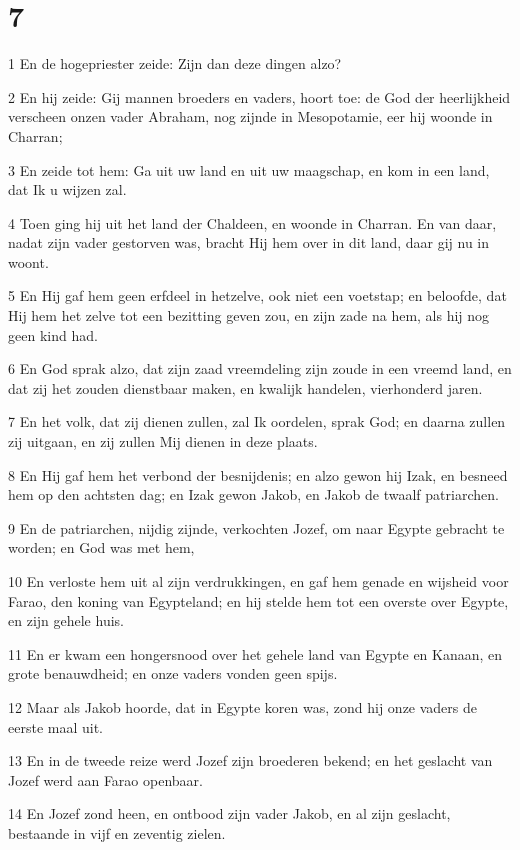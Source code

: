 \chapter{7}

\par 1 En de hogepriester zeide: Zijn dan deze dingen alzo?
\par 2 En hij zeide: Gij mannen broeders en vaders, hoort toe: de God der heerlijkheid verscheen onzen vader Abraham, nog zijnde in Mesopotamie, eer hij woonde in Charran;
\par 3 En zeide tot hem: Ga uit uw land en uit uw maagschap, en kom in een land, dat Ik u wijzen zal.
\par 4 Toen ging hij uit het land der Chaldeen, en woonde in Charran. En van daar, nadat zijn vader gestorven was, bracht Hij hem over in dit land, daar gij nu in woont.
\par 5 En Hij gaf hem geen erfdeel in hetzelve, ook niet een voetstap; en beloofde, dat Hij hem het zelve tot een bezitting geven zou, en zijn zade na hem, als hij nog geen kind had.
\par 6 En God sprak alzo, dat zijn zaad vreemdeling zijn zoude in een vreemd land, en dat zij het zouden dienstbaar maken, en kwalijk handelen, vierhonderd jaren.
\par 7 En het volk, dat zij dienen zullen, zal Ik oordelen, sprak God; en daarna zullen zij uitgaan, en zij zullen Mij dienen in deze plaats.
\par 8 En Hij gaf hem het verbond der besnijdenis; en alzo gewon hij Izak, en besneed hem op den achtsten dag; en Izak gewon Jakob, en Jakob de twaalf patriarchen.
\par 9 En de patriarchen, nijdig zijnde, verkochten Jozef, om naar Egypte gebracht te worden; en God was met hem,
\par 10 En verloste hem uit al zijn verdrukkingen, en gaf hem genade en wijsheid voor Farao, den koning van Egypteland; en hij stelde hem tot een overste over Egypte, en zijn gehele huis.
\par 11 En er kwam een hongersnood over het gehele land van Egypte en Kanaan, en grote benauwdheid; en onze vaders vonden geen spijs.
\par 12 Maar als Jakob hoorde, dat in Egypte koren was, zond hij onze vaders de eerste maal uit.
\par 13 En in de tweede reize werd Jozef zijn broederen bekend; en het geslacht van Jozef werd aan Farao openbaar.
\par 14 En Jozef zond heen, en ontbood zijn vader Jakob, en al zijn geslacht, bestaande in vijf en zeventig zielen.

